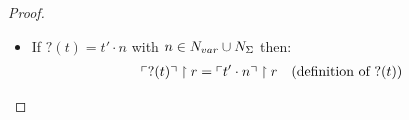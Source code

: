 \begin{proof}
\begin{itemize}
\item If $?(t) = t' \cdot n$ with $n \in N_{var} \cup N_{\Sigma}$ then:
%
    \begin{align*}
    \pview{?(t)} \upharpoonright  r
&= \pview{t' \cdot n} \upharpoonright  r & (\mbox{definition of } ?(t))\\

\end{align*}
\end{itemize}
\end{proof}
